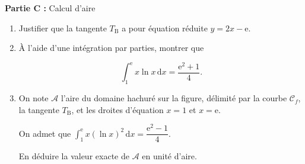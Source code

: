 \documentclass[10pt]{article}
\providecommand{\e}{{\mathrm{e}}}
\begin{document}
\begin{center}\textbf{Partie C :} Calcul d'aire\end{center}

\begin{enumerate}
\item Justifier que la tangente $T_{\text{B}}$ a pour équation réduite $y = 2x - \e$.


\item À l'aide d'une intégration par parties, montrer que

\[\displaystyle\int_1^{\e} x\ln x\, \text{d}x = \dfrac{\e^2 + 1}{4}.\]
\item On note $\mathcal{A}$ l'aire du domaine hachuré sur la figure, délimité par la courbe $\mathcal{C}_f$, la tangente $T_{\text{B}}$, et les droites d'équation $x = 1$ et $x = \e$.

On admet que $\displaystyle\int_1^{\e} x(\ln x)^2\,\text{d}x = \dfrac{\e^2 - 1}{4}$.

En déduire la valeur exacte de $\mathcal{A}$ en unité d'aire.
\end{enumerate}

\bigskip
\end{document}
